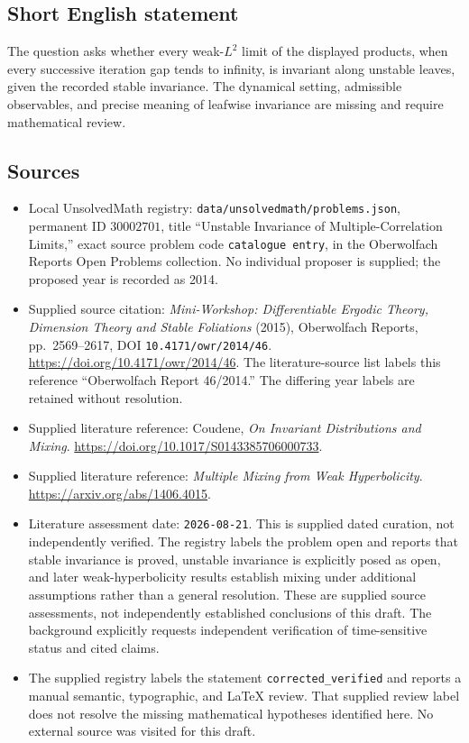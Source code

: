 \documentclass[11pt]{article}
\begin{document}
\subsection{Short English statement}
The question asks whether every weak-\(L^2\) limit of the displayed products, when every successive iteration gap tends to infinity, is invariant along unstable leaves, given the recorded stable invariance. The dynamical setting, admissible observables, and precise meaning of leafwise invariance are missing and require mathematical review.
\subsection{Sources}
\begin{itemize}
\item Local UnsolvedMath registry: \texttt{data/unsolvedmath/problems.json}, permanent ID \(30002701\), title ``Unstable Invariance of Multiple-Correlation Limits,'' exact source problem code \texttt{catalogue entry}, in the Oberwolfach Reports Open Problems collection. No individual proposer is supplied; the proposed year is recorded as 2014.
\item Supplied source citation: \emph{Mini-Workshop: Differentiable Ergodic Theory, Dimension Theory and Stable Foliations} (2015), Oberwolfach Reports, pp.~2569--2617, DOI \texttt{10.4171/owr/2014/46}. \url{https://doi.org/10.4171/owr/2014/46}. The literature-source list labels this reference ``Oberwolfach Report 46/2014.'' The differing year labels are retained without resolution.
\item Supplied literature reference: Coudene, \emph{On Invariant Distributions and Mixing}. \url{https://doi.org/10.1017/S0143385706000733}.
\item Supplied literature reference: \emph{Multiple Mixing from Weak Hyperbolicity}. \url{https://arxiv.org/abs/1406.4015}.
\item Literature assessment date: \texttt{2026-08-21}. This is supplied dated curation, not independently verified. The registry labels the problem open and reports that stable invariance is proved, unstable invariance is explicitly posed as open, and later weak-hyperbolicity results establish mixing under additional assumptions rather than a general resolution. These are supplied source assessments, not independently established conclusions of this draft. The background explicitly requests independent verification of time-sensitive status and cited claims.
\item The supplied registry labels the statement \texttt{corrected\_verified} and reports a manual semantic, typographic, and LaTeX review. That supplied review label does not resolve the missing mathematical hypotheses identified here. No external source was visited for this draft.
\end{itemize}
\end{document}
